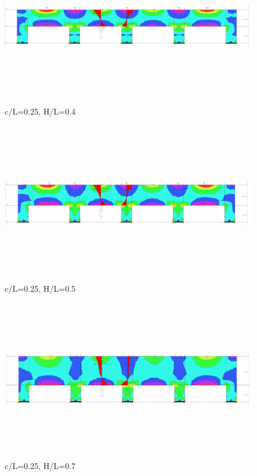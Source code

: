 \documentclass[11pt, a4paper]{article}
\begin{document}
\begin{figure}[H]
	\includegraphics[width=\textwidth, height=7cm]{Slike/C-L_0-25 (0-4).png}
	\caption{c/L=0.25, H/L=0.4}
\end{figure}

\begin{figure}[H]
	\includegraphics[width=\textwidth, height=7cm]{Slike/C-L_0-25 (0-5).png}
	\caption{c/L=0.25, H/L=0.5}
\end{figure}
\newpage
\begin{figure}[H]
	\includegraphics[width=\textwidth, height=7cm]{Slike/C-L_0-25 (0-7).png}
	\caption{c/L=0.25, H/L=0.7}
\end{figure}
\end{document}
